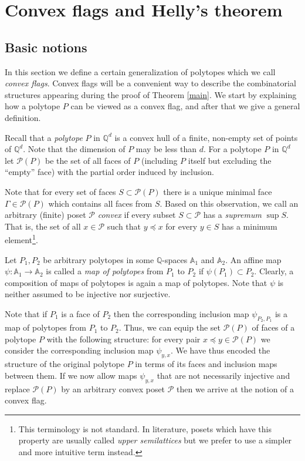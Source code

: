 \documentclass{daj}
\newcommand{\Q}{\mathbb Q}
\newcommand{\A}{\mathbb A}
\renewcommand{\P}{\mathcal P}
\theoremstyle{definition}
\theoremstyle{remark}
\theoremstyle{definition}
\theoremstyle{definition}
\begin{document}
\section{Convex flags and Helly's theorem}\label{s2}

\subsection{Basic notions} 

In this section we define a certain generalization of polytopes which we call {\em convex flags}. Convex flags will be a convenient way to describe the combinatorial structures appearing during the proof of Theorem \ref{main}. We start by explaining how a polytope $P$ can be viewed as a convex flag, and after that we give a general definition.

Recall that a {\it polytope} $P$ in $\Q^d$ is a convex hull of a finite, non-empty set of points of $\Q^d$. Note that the dimension of $P$ may be less than $d$. For a polytope $P$ in $\Q^d$ let $\P(P)$  be the set of all faces of $P$ (including $P$ itself but excluding the ``empty'' face) with the partial order induced by inclusion. 

Note that for every set of faces $S \subset \P(P)$ there is a unique minimal face $\Gamma \in \P(P)$ which contains all faces from $S$. 
Based on this observation, we call an arbitrary (finite) poset $\P$ {\it convex} if every subset $S \subset \P$ has a {\it supremum} $\sup S$. That is, the set of all $x \in \P$ such that $y \preceq x$ for every $y \in S$ has a minimum element\footnote{This terminology is not standard. In literature, posets which have this property are usually called {\it upper semilattices} but we prefer to use a simpler and more intuitive term instead. }.

Let $P_1, P_2$ be arbitrary polytopes in some $\Q$-spaces $\A_1$ and $\A_2$. An affine map $\psi: \A_1 \rightarrow \A_2$ is called a {\it map of polytopes} from $P_1$ to $P_2$ if $\psi(P_1) \subset P_2$. Clearly, a composition of maps of polytopes is again a map of polytopes. Note that $\psi$ is neither assumed to be injective nor surjective. 

Note that if $P_1$ is a face of $P_2$ then the corresponding inclusion map $\psi_{P_2, P_1}$ is a map of polytopes from $P_1$ to $P_2$. 
Thus, we can equip the set $\P(P)$ of faces of a polytope $P$ with the following structure: for every pair $x \preceq y \in \P(P)$ we consider the corresponding inclusion map $\psi_{y, x}$. We have thus encoded the structure of the original polytope $P$ in terms of its faces and inclusion maps between them. If we now allow maps $\psi_{y, x}$ that are not necessarily injective and replace $\P(P)$ by an arbitrary convex poset $\P$ then we arrive at the notion of a convex flag.
\end{document}
